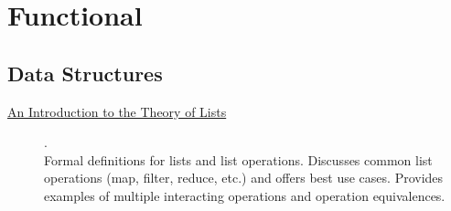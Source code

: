 \chapter {Functional}

\section{Data Structures}

\begin{description}
    \item[\href{https://www.cs.ox.ac.uk/files/3378/PRG56.pdf}{An Introduction to the Theory of Lists}] {\cite{bird1987introduction}.
          \\ Formal definitions for lists and list operations. Discusses common list operations (map, filter, reduce, etc.) and offers best use cases. Provides examples of multiple interacting operations and operation equivalences.
          \\ }
\end{description}
